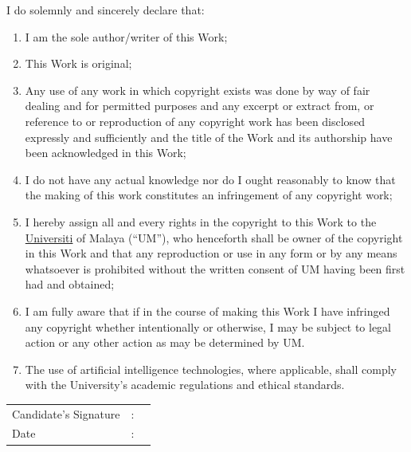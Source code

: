 \documentclass[12pt, a4paper]{report}
\begin{document}
\vspace{1.5em}

\noindent I do solemnly and sincerely declare that:

\begin{enumerate}
    \item I am the sole author/writer of this Work;
    \item This Work is original;
    \item Any use of any work in which copyright exists was done by way of fair dealing and for permitted purposes and any excerpt or extract from, or reference to or reproduction of any copyright work has been disclosed expressly and sufficiently and the title of the Work and its authorship have been acknowledged in this Work;
    \item I do not have any actual knowledge nor do I ought reasonably to know that the making of this work constitutes an infringement of any copyright work;
    \item I hereby assign all and every rights in the copyright to this Work to the \underline{Universiti} of Malaya (``UM''), who henceforth shall be owner of the copyright in this Work and that any reproduction or use in any form or by any means whatsoever is prohibited without the written consent of UM having been first had and obtained;
    \item I am fully aware that if in the course of making this Work I have infringed any copyright whether intentionally or otherwise, I may be subject to legal action or any other action as may be determined by UM.
    \item The use of artificial intelligence technologies, where applicable, shall comply with the University's academic regulations and ethical standards.
\end{enumerate}

\vspace{2em}

\noindent
\begin{tabular}{@{}p{}p{}p{}@{}}
Candidate's Signature & : & \underline{\hspace{6cm}} \\[1em]
Date                  & : & \underline{\hspace{6cm}} \\
\end{tabular}

\vspace{2.5em}
\end{document}
